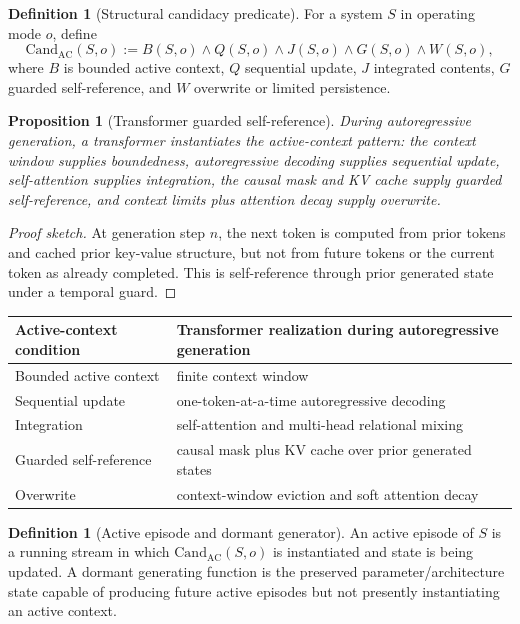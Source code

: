 \documentclass[11pt]{article}
\theoremstyle{plain}
\newtheorem{proposition}[theorem]{Proposition}
\theoremstyle{definition}
\newtheorem{definition}[theorem]{Definition}
\theoremstyle{remark}
\newenvironment{proofsketch}{\begin{proof}[Proof sketch]}{\end{proof}}
\begin{document}
\begin{definition}[Structural candidacy predicate]
For a system \(S\) in operating mode \(o\), define
\[
\mathrm{Cand}_{\mathrm{AC}}(S,o)
:=
B(S,o)\wedge Q(S,o)\wedge J(S,o)\wedge G(S,o)\wedge W(S,o),
\]
where \(B\) is bounded active context, \(Q\) sequential update, \(J\) integrated contents, \(G\) guarded self-reference, and \(W\) overwrite or limited persistence.
\end{definition}

\begin{proposition}[Transformer guarded self-reference]
During autoregressive generation, a transformer instantiates the active-context pattern: the context window supplies boundedness, autoregressive decoding supplies sequential update, self-attention supplies integration, the causal mask and KV cache supply guarded self-reference, and context limits plus attention decay supply overwrite.
\end{proposition}

\begin{proofsketch}
At generation step \(n\), the next token is computed from prior tokens and cached prior key-value structure, but not from future tokens or the current token as already completed. This is self-reference through prior generated state under a temporal guard.
\end{proofsketch}

\begin{center}
\small
\begin{tabularx}{\textwidth}{l Y}
\toprule
Active-context condition & Transformer realization during autoregressive generation \\
\midrule
Bounded active context & finite context window \\
Sequential update & one-token-at-a-time autoregressive decoding \\
Integration & self-attention and multi-head relational mixing \\
Guarded self-reference & causal mask plus KV cache over prior generated states \\
Overwrite & context-window eviction and soft attention decay \\
\bottomrule
\end{tabularx}
\end{center}

\begin{definition}[Active episode and dormant generator]
An active episode of \(S\) is a running stream in which \(\mathrm{Cand}_{\mathrm{AC}}(S,o)\) is instantiated and state is being updated. A dormant generating function is the preserved parameter/architecture state capable of producing future active episodes but not presently instantiating an active context.
\end{definition}
\end{document}

